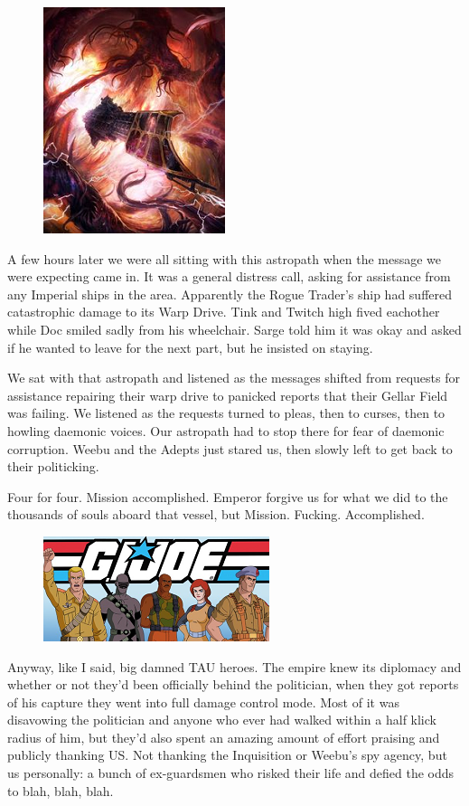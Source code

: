\begin{figure}
	\begin{center}
		\includegraphics[width=\figwidth]{pics/10/75.png}
	\end{center}
\end{figure}
A few hours later we were all sitting with this astropath when the message we were expecting came in. 
It was a general distress call, asking for assistance from any Imperial ships in the area. 
Apparently the Rogue Trader's ship had suffered catastrophic damage to its Warp Drive. 
Tink and Twitch high fived eachother while Doc smiled sadly from his wheelchair. 
Sarge told him it was okay and asked if he wanted to leave for the next part, but he insisted on staying.

We sat with that astropath and listened as the messages shifted from requests for assistance repairing their warp drive to panicked reports that their Gellar Field was failing. 
We listened as the requests turned to pleas, then to curses, then to howling daemonic voices. 
Our astropath had to stop there for fear of daemonic corruption. 
Weebu and the Adepts just stared us, then slowly left to get back to their politicking.

Four for four. 
Mission accomplished. 
Emperor forgive us for what we did to the thousands of souls aboard that vessel, but Mission. 
Fucking. 
Accomplished.

\begin{figure}
	\begin{center}
		\includegraphics[width=\figwidth]{pics/10/76.png}
	\end{center}
\end{figure}
Anyway, like I said, big damned TAU heroes. 
The empire knew its diplomacy and whether or not they'd been officially behind the politician, when they got reports of his capture they went into full damage control mode. 
Most of it was disavowing the politician and anyone who ever had walked within a half klick radius of him, but they'd also spent an amazing amount of effort praising and publicly thanking US. 
Not thanking the Inquisition or Weebu's spy agency, but us personally: 
a bunch of ex-guardsmen who risked their life and defied the odds to blah, blah, blah.

